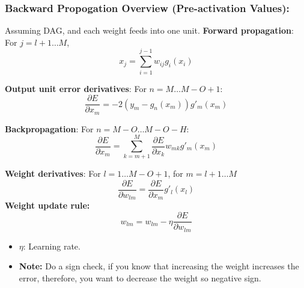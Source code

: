\subsubsection{Backward Propogation Overview (Pre-activation Values):}
\begin{definition}
    Assuming DAG, and each weight feeds into one unit.
    \textbf{Forward propagation}:
    For $j = l+1 \dots M$, 
    \[
    x_j = \sum_{i=1}^{j-1} w_{ij} g_i(x_i)
    \]

    \textbf{Output unit error derivatives}:
    For $n = M \dots M-O+1$:
    \[
    \frac{\partial E}{\partial x_m} = -2(y_m - g_n(x_m)) g'_m(x_m)
    \]

    \textbf{Backpropagation}:
    For $n = M-O \dots M-O-H$:
    \[
    \frac{\partial E}{\partial x_m} = \sum_{k=m+1}^{M} \frac{\partial E}{\partial x_k} w_{mk} g'_m(x_m)
    \]

    \textbf{Weight derivatives}:
    For $l = 1 \dots M-O+1$, for $m = l+1 \dots M$
    \[
    \frac{\partial E}{\partial w_{lm}} = \frac{\partial E}{\partial x_m} g'_l(x_l)
    \]
    \textbf{Weight update rule:}
    \[
    w_{lm} = w_{lm} - \eta \frac{\partial E}{\partial w_{lm}}
    \]
    \begin{itemize}
        \item $\eta$: Learning rate.
        \item \textbf{Note:} Do a sign check, if you know that increasing the weight increases the error, therefore, you want to decrease the weight so negative sign. 
    \end{itemize}
\end{definition}

